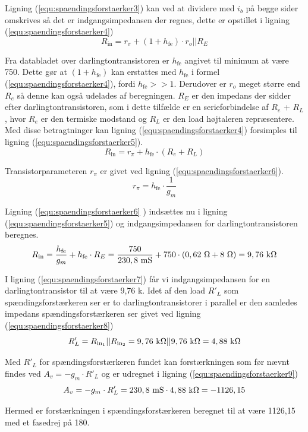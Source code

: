 Ligning (\ref{equ:spaendingsforstaerker3}) kan ved at dividere med $i_b$ på begge sider omskrives så det er indgangsimpedansen der regnes, dette er opstillet i ligning (\ref{equ:spaendingsforstaerker4})
\begin{equation}
\label{equ:spaendingsforstaerker4}
R_{\mathrm{in}} = r_{\pi} + (1+h_{\mathrm{fe}}) \cdot r_o||R_E 
\end{equation}

Fra databladet over darlingtontransistoren er $h_{\mathrm{fe}}$ angivet til minimum at være 750. Dette gør at  $(1+h_{\mathrm{fe}})$ kan erstattes med $h_{\mathrm{fe}}$ i formel (\ref{equ:spaendingsforstaerker4}), fordi $h_{\mathrm{fe}} >> 1$. Derudover er $r_o$ meget større end $R_e$ så denne kan også udelades af beregningen. $R_E$ er den impedans der sidder efter darlingtontransistoren, som i dette tilfælde er en serieforbindelse af $R_e$ + $R_L$, hvor $R_e$ er den termiske modstand og $R_L$ er den load højtaleren repræsentere. Med disse betragtninger kan ligning (\ref{equ:spaendingsforstaerker4}) forsimples til ligning (\ref{equ:spaendingsforstaerker5}).
\begin{equation}
\label{equ:spaendingsforstaerker5}
R_{\mathrm{in}} = r_{\pi} + h_{\mathrm{fe}} \cdot (R_e + R_L)
\end{equation}

Transistorparameteren $r_{\pi}$ er givet ved ligning (\ref{equ:spaendingsforstaerker6}).
\begin{equation}
\label{equ:spaendingsforstaerker6}
r_{\pi} = h_{\mathrm{fe}} \cdot \frac{1}{g_m}
\end{equation}

Ligning (\ref{equ:spaendingsforstaerker6} ) indsættes nu i ligning (\ref{equ:spaendingsforstaerker5}) og indgangsimpedansen for darlingtontransistoren beregnes.
\begin{equation}
\label{equ:spaendingsforstaerker7}
R_{\mathrm{in}} = \frac{h_{\mathrm{fe}}}{g_m} + h_{\mathrm{fe}} \cdot R_E = \frac{750}{230,8~\mathrm{mS}} + 750 \cdot (0,62~\ohm + 8~\ohm) = 9,76~\mathrm{k}\ohm  
\end{equation}

I ligning (\ref{equ:spaendingsforstaerker7}) får vi indgangsimpedansen for en darlingtontransistor til at være 9,76 k\ohm. Idet af den load $R'_L$ som spændingsforstærkeren ser er to darlingtontransistorer i parallel er den samledes impedans spændingsforstærkeren ser givet ved ligning (\ref{equ:spaendingsforstaerker8})
\begin{equation}
\label{equ:spaendingsforstaerker8}
R'_L = R_{\mathrm{in}_1}||R_{\mathrm{in}_2} = 9,76~\mathrm{k}\ohm||9,76~\mathrm{k}\ohm = 4,88~\mathrm{k}\ohm
\end{equation}  

Med $R'_L$ for spændingsforstærkeren fundet kan forstærkningen som før nævnt findes ved $A_v = -g_m \cdot R'_L$ og er udregnet i ligning (\ref{equ:spaendingsforstaerker9})
\begin{equation}
\label{equ:spaendingsforstaerker9}
A_v = -g_m \cdot R'_L = 230,8~\mathrm{mS} \cdot 4,88~\mathrm{k}\ohm = -1126,15
\end{equation}

Hermed er forstærkningen i spændingsforstærkeren beregnet til at være 1126,15 med et fasedrej på 180\degree .